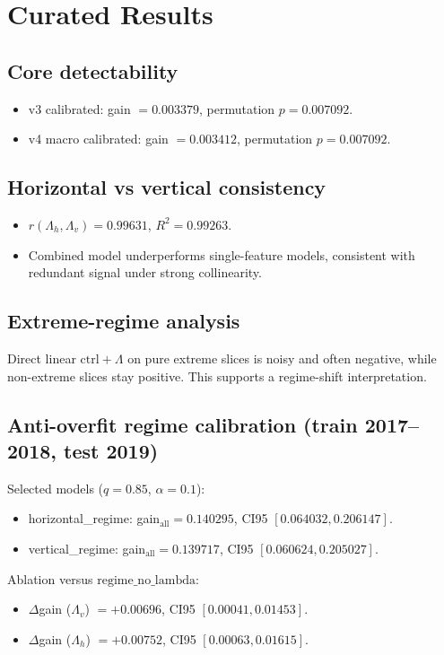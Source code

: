 \documentclass[11pt]{article}
\begin{document}
\section{Curated Results}
\subsection{Core detectability}
\begin{itemize}
  \item v3 calibrated: gain \(=0.003379\), permutation \(p=0.007092\).
  \item v4 macro calibrated: gain \(=0.003412\), permutation \(p=0.007092\).
\end{itemize}

\subsection{Horizontal vs vertical consistency}
\begin{itemize}
  \item \(r(\Lambda_h,\Lambda_v)=0.99631\), \(R^2=0.99263\).
  \item Combined model underperforms single-feature models, consistent with redundant signal under strong collinearity.
\end{itemize}

\subsection{Extreme-regime analysis}
Direct linear \(\mathrm{ctrl}+\Lambda\) on pure extreme slices is noisy and often negative, while non-extreme slices stay positive. This supports a regime-shift interpretation.

\subsection{Anti-overfit regime calibration (train 2017--2018, test 2019)}
Selected models (\(q=0.85\), \(\alpha=0.1\)):
\begin{itemize}
  \item horizontal\_regime: gain\(_\mathrm{all}=0.140295\), CI95 \([0.064032,0.206147]\).
  \item vertical\_regime: gain\(_\mathrm{all}=0.139717\), CI95 \([0.060624,0.205027]\).
\end{itemize}

Ablation versus \(\mathrm{regime\_no\_lambda}\):
\begin{itemize}
  \item \(\Delta\)gain (\(\Lambda_v\)) \(=+0.00696\), CI95 \([0.00041,0.01453]\).
  \item \(\Delta\)gain (\(\Lambda_h\)) \(=+0.00752\), CI95 \([0.00063,0.01615]\).
\end{itemize}
\end{document}
